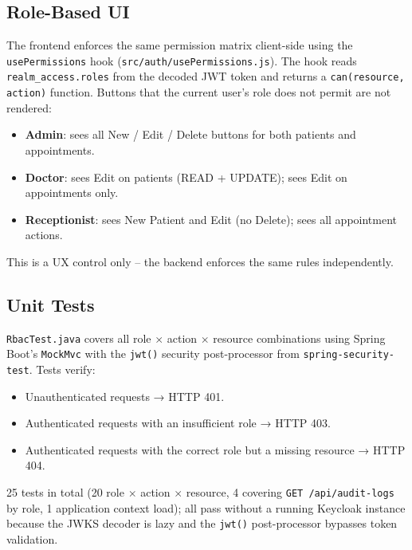 \documentclass[12pt,a4paper]{report}
\begin{document}
\subsection{Role-Based UI}

The frontend enforces the same permission matrix client-side using the \texttt{usePermissions}
hook (\texttt{src/auth/usePermissions.js}). The hook reads \texttt{realm\_access.roles} from
the decoded JWT token and returns a \texttt{can(resource, action)} function. Buttons that
the current user's role does not permit are not rendered:

\begin{itemize}
  \item \textbf{Admin}: sees all New / Edit / Delete buttons for both patients and appointments.
  \item \textbf{Doctor}: sees Edit on patients (READ + UPDATE); sees Edit on appointments only.
  \item \textbf{Receptionist}: sees New Patient and Edit (no Delete); sees all appointment actions.
\end{itemize}

This is a UX control only -- the backend enforces the same rules independently.

\subsection{Unit Tests}

\texttt{RbacTest.java} covers all role $\times$ action $\times$ resource combinations using
Spring Boot's \texttt{MockMvc} with the \texttt{jwt()} security post-processor from
\texttt{spring-security-test}. Tests verify:

\begin{itemize}
  \item Unauthenticated requests → HTTP 401.
  \item Authenticated requests with an insufficient role → HTTP 403.
  \item Authenticated requests with the correct role but a missing resource → HTTP 404.
\end{itemize}

25 tests in total (20 role $\times$ action $\times$ resource, 4 covering \texttt{GET /api/audit-logs} by role, 1 application context load); all pass without a running Keycloak instance because the JWKS decoder
is lazy and the \texttt{jwt()} post-processor bypasses token validation.

\end{document}
